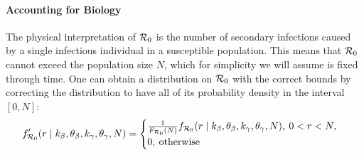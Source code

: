 \documentclass[alpha-refs]{wiley-article}
\newcommand{\rr}{ {\cal R}_0 }						%
\begin{document}
\paragraph{Accounting for Biology}

The physical interpretation of $\rr$ is the number of secondary infections caused by a single infectious individual in a susceptible population.
This means that $\rr$ cannot exceed the population size $N$, which for simplicity we will assume is fixed through time.
One can obtain a distribution on $\rr$ with the correct bounds by correcting the distribution to have all of its probability density in the interval $[0, N]$:
\begin{equation}
f_{\rr}^\prime(r \mid k_{\beta}, \theta_{\beta}, k_{\gamma}, \theta_{\gamma}, N) =  
 \begin{cases}
  \frac{1}{ F_{\rr}(N)} f_{\rr}(r \mid k_{\beta}, \theta_{\beta},  k_{\gamma}, \theta_{\gamma}, N ), \:  0 < r < N, \\
  0, \: \text{otherwise}
 \end{cases}
\end{equation}

\end{document}

